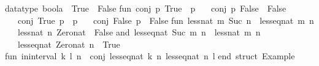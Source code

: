 \begin{isabellebody}
\begin{isamarkuptext}
\begin{typewriter}
\isanewline
datatype\ boola\ {\isacharequal}\ True\ {\isacharbar}\ False{\isacharsemicolon}\isanewline
\isanewline
fun\ conj\ p\ True\ {\isacharequal}\ p\isanewline
\ \ {\isacharbar}\ conj\ p\ False\ {\isacharequal}\ False\isanewline
\ \ {\isacharbar}\ conj\ True\ p\ {\isacharequal}\ p\isanewline
\ \ {\isacharbar}\ conj\ False\ p\ {\isacharequal}\ False{\isacharsemicolon}\isanewline
\isanewline
fun\ less{\isacharunderscore}nat\ m\ {\isacharparenleft}Suc\ n{\isacharparenright}\ {\isacharequal}\ less{\isacharunderscore}eq{\isacharunderscore}nat\ m\ n\isanewline
\ \ {\isacharbar}\ less{\isacharunderscore}nat\ n\ Zero{\isacharunderscore}nat\ {\isacharequal}\ False\isanewline
and\ less{\isacharunderscore}eq{\isacharunderscore}nat\ {\isacharparenleft}Suc\ m{\isacharparenright}\ n\ {\isacharequal}\ less{\isacharunderscore}nat\ m\ n\isanewline
\ \ {\isacharbar}\ less{\isacharunderscore}eq{\isacharunderscore}nat\ Zero{\isacharunderscore}nat\ n\ {\isacharequal}\ True{\isacharsemicolon}\isanewline
\isanewline
fun\ in{\isacharunderscore}interval\ {\isacharparenleft}k{\isacharcomma}\ l{\isacharparenright}\ n\ {\isacharequal}\ conj\ {\isacharparenleft}less{\isacharunderscore}eq{\isacharunderscore}nat\ k\ n{\isacharparenright}\ {\isacharparenleft}less{\isacharunderscore}eq{\isacharunderscore}nat\ n\ l{\isacharparenright}{\isacharsemicolon}\isanewline
\isanewline
end{\isacharsemicolon}\ {\isacharparenleft}{\isacharasterisk}struct\ Example{\isacharasterisk}{\isacharparenright}\isanewline


\end{typewriter}
\end{isamarkuptext}
\end{isabellebody}

